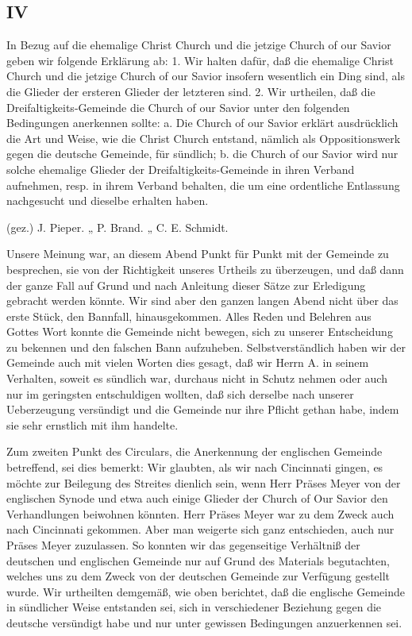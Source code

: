 \subsection{IV}

In Bezug auf die ehemalige Christ Church und die jetzige Church of our Savior geben wir folgende Erklärung ab: 1. Wir halten dafür, daß die ehemalige Christ Church und die jetzige Church of our Savior insofern wesentlich ein Ding sind, als die Glieder der ersteren Glieder der letzteren sind. 2. Wir urtheilen, daß die Dreifaltigkeits-Gemeinde die Church of our Savior unter den folgenden Bedingungen anerkennen sollte: a. Die Church of our Savior erklärt ausdrücklich die Art und Weise, wie die Christ Church entstand, nämlich als Oppositionswerk gegen die deutsche Gemeinde, für sündlich; b. die Church of our Savior wird nur solche ehemalige Glieder der Dreifaltigkeits-Gemeinde in ihren Verband aufnehmen, resp. in ihrem Verband behalten, die um eine ordentliche Entlassung nachgesucht und dieselbe erhalten haben.

(gez.) J. Pieper.
„ P. Brand.
„ C. E. Schmidt.

Unsere Meinung war, an diesem Abend Punkt für Punkt mit der Gemeinde zu besprechen, sie von der Richtigkeit unseres Urtheils zu überzeugen, und daß dann der ganze Fall auf Grund und nach Anleitung dieser Sätze zur Erledigung gebracht werden könnte. Wir sind aber den ganzen langen Abend nicht über das erste Stück, den Bannfall, hinausgekommen. Alles Reden und Belehren aus Gottes Wort konnte die Gemeinde nicht bewegen, sich zu unserer Entscheidung zu bekennen und den falschen Bann aufzuheben. Selbstverständlich haben wir der Gemeinde auch mit vielen Worten dies gesagt, daß wir Herrn A. in seinem Verhalten, soweit es sündlich war, durchaus nicht in Schutz nehmen oder auch nur im geringsten entschuldigen wollten, daß sich derselbe nach unserer Ueberzeugung versündigt und die Gemeinde nur ihre Pflicht gethan habe, indem sie sehr ernstlich mit ihm handelte.

Zum zweiten Punkt des Circulars, die Anerkennung der englischen Gemeinde betreffend, sei dies bemerkt: Wir glaubten, als wir nach Cincinnati gingen, es möchte zur Beilegung des Streites dienlich sein, wenn Herr Präses Meyer von der englischen Synode und etwa auch einige Glieder der Church of Our Savior den Verhandlungen beiwohnen könnten. Herr Präses Meyer war zu dem Zweck auch nach Cincinnati gekommen. Aber man weigerte sich ganz entschieden, auch nur Präses Meyer zuzulassen. So konnten wir das gegenseitige Verhältniß der deutschen und englischen Gemeinde nur auf Grund des Materials begutachten, welches uns zu dem Zweck von der deutschen Gemeinde zur Verfügung gestellt wurde. Wir urtheilten demgemäß, wie oben berichtet, daß die englische Gemeinde in sündlicher Weise entstanden sei, sich in verschiedener Beziehung gegen die deutsche versündigt habe und nur unter gewissen Bedingungen anzuerkennen sei.

